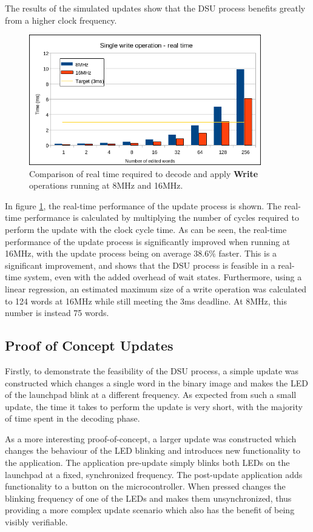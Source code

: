 The results of the simulated updates show that the DSU process benefits greatly from a higher clock frequency. 
\begin{figure}[!ht]
    \centering
    \includegraphics[width=0.9\textwidth]{img/W8vs16_rt.png}
    \caption{Comparison of real time required to decode and apply \textbf{Write} operations running at 8MHz and 16MHz.}
    \label{fig:s8vs16}
\end{figure}

In figure \ref{fig:s8vs16}, the real-time performance of the update process is shown. The real-time performance is calculated by multiplying the number of cycles required to perform the update with the clock cycle time. As can be seen, the real-time performance of the update process is significantly improved when running at 16MHz, with the update process being on average $38.6\%$ faster. This is a significant improvement, and shows that the DSU process is feasible in a real-time system, even with the added overhead of wait states. Furthermore, using a linear regression, an estimated maximum size of a write operation was calculated to 124 words at 16MHz while still meeting the 3ms deadline. At 8MHz, this number is instead 75 words. 
\subsection{Proof of Concept Updates}
Firstly, to demonstrate the feasibility of the DSU process, a simple update was constructed which changes a single word in the binary image and makes the LED of the launchpad blink at a different frequency. 
As expected from such a small update, the time it takes to perform the update is very short, with the majority of time spent in the decoding phase. 

As a more interesting proof-of-concept, a larger update was constructed which changes the behaviour of the LED blinking and introduces new functionality to the application. The application pre-update simply blinks both LEDs on the launchpad at a fixed, synchronized frequency. The post-update application adds functionality to a button on the microcontroller. When pressed changes the blinking frequency of one of the LEDs and makes them unsynchronized, thus providing a more complex update scenario which also has the benefit of being visibly verifiable. 

